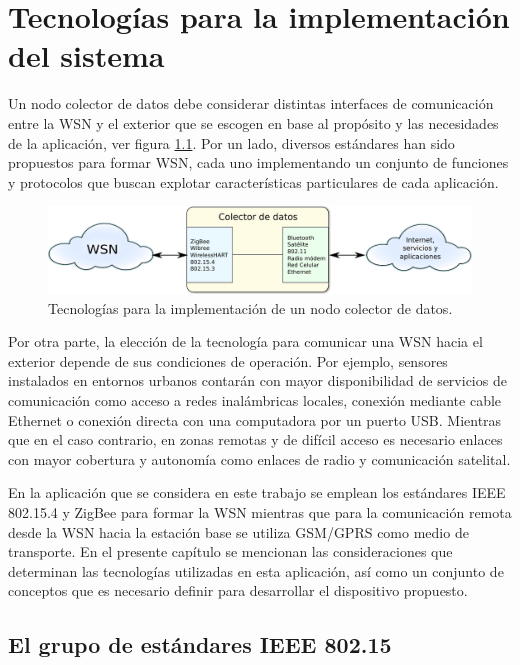 \chapter{Tecnologías para la implementación del sistema}

Un nodo colector de datos debe considerar distintas interfaces de comunicación entre la WSN y el exterior que se escogen en base al propósito y las necesidades de la aplicación, ver figura \ref{fig:colector_datos}. Por un lado, diversos estándares han sido propuestos para formar WSN, cada uno implementando un conjunto de funciones y protocolos que buscan explotar características particulares de cada aplicación\cite{yick:wsn_survey}.

\begin{figure}
	\centering
	\includegraphics[scale=0.8]{capitulo_2_imgs/colector_de_datos.pdf}
	\caption{Tecnolog\'ias para la implementaci\'on de un nodo colector de datos.}
	\label{fig:colector_datos}
\end{figure}

Por otra parte, la elección de la tecnología para comunicar una WSN hacia el exterior depende de sus condiciones de operación. Por ejemplo, sensores instalados en entornos urbanos contarán con mayor disponibilidad de servicios de comunicación como acceso a redes inalámbricas locales, conexión mediante cable Ethernet o conexión directa con una computadora por un puerto USB. Mientras que en el caso contrario, en zonas remotas y de difícil acceso es necesario enlaces con mayor cobertura y autonomía como enlaces de radio y comunicación satelital. 

En la aplicación que se considera en este trabajo se emplean los estándares IEEE 802.15.4 y ZigBee para formar la WSN mientras que para la comunicación remota desde la WSN hacia la estación base se utiliza GSM/GPRS como medio de transporte. En el presente capítulo se mencionan las consideraciones que determinan las tecnologías utilizadas en esta aplicación, así como un conjunto de conceptos que es necesario definir para desarrollar el dispositivo propuesto. 

\section{El grupo de est\'andares IEEE 802.15}

